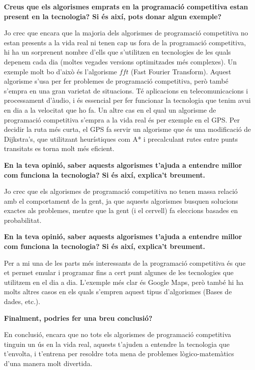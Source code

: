 \textbf{Creus que els algorismes emprats en la programació competitiva estan present en la tecnologia? Si és així, pots donar algun exemple?} \newline

Jo crec que encara que la majoria dels algorismes de programació competitiva no estan presents a la vida real ni tenen cap us fora de la programació competitiva, hi ha un sorprenent nombre d'ells que s'utilitzen en tecnologies de les quals depenem cada dia (moltes vegades versions optimitzades més complexes). Un exemple molt bo d'això és l'algorisme $fft$ (Fast Fourier Transform). Aquest algorisme s'usa per fer problemes de programació competitiva, però també s'empra en una gran varietat de situacions. Té aplicacions en telecomunicacions i processament d'àudio, i és essencial per fer funcionar la tecnologia que tenim avui en dia a la velocitat que ho fa. Un altre cas en el qual un algorisme de programació competitiva s'empra a la vida real és per exemple en el GPS. Per decidir la ruta més curta, el GPS fa servir un algorisme que és una modificació de Dijkstra's, que utilitzant heurístiques com A* i precalculant rutes entre punts transitats es torna molt més eficient. \newline

\textbf{En la teva opinió, saber aquests algorismes t'ajuda a entendre millor com funciona la tecnologia? Si és així, explica't breument.} \newline

Jo crec que els algorismes de programació competitiva no tenen massa relació amb el comportament de la gent, ja que aquests algorismes busquen solucions exactes als problemes, mentre que la gent (i el cervell) fa eleccions basades en probabilitat. \newline

\textbf{En la teva opinió, saber aquests algorismes t'ajuda a entendre millor com funciona la tecnologia? Si és així, explica't breument.} \newline

Per a mi una de les parts més interessants de la programació competitiva és que et permet emular i programar fins a cert punt algunes de les tecnologies que utilitzem en el dia a dia. L'exemple més clar és Google Maps, però també hi ha molts altres casos en els quals s'empren aquest tipus d'algorismes (Bases de dades, etc.). \newline

\textbf{Finalment, podries fer una breu conclusió?} \newline

En conclusió, encara que no tots els algorismes de programació competitiva tinguin un ús en la vida real, aquests t'ajuden a entendre la tecnologia que t'envolta, i t'entrena per resoldre tota mena de problemes lògico-matemàtics d'una manera molt divertida.